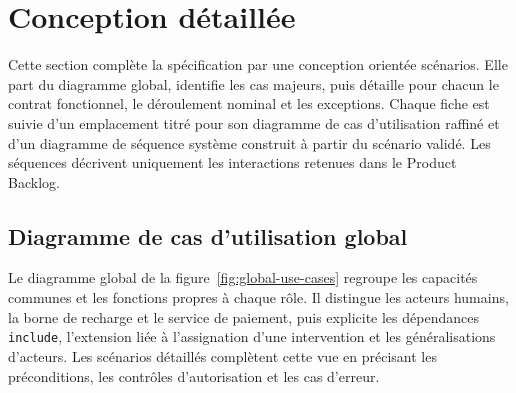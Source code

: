 \section{Conception détaillée}

Cette section complète la spécification par une conception orientée scénarios.
Elle part du diagramme global, identifie les cas majeurs, puis détaille pour chacun
le contrat fonctionnel, le déroulement nominal et les exceptions. Chaque fiche est
suivie d'un emplacement titré pour son diagramme de cas d'utilisation raffiné et
d'un diagramme de séquence système construit à partir du scénario validé. Les
séquences décrivent uniquement les interactions retenues dans le Product Backlog.

\newcommand{\UseCaseUmlPlate}[3]{%
  \begin{figure}[p]
    \centering
    \begin{tcolorbox}[
      width=0.94\textwidth,
      height=7.0cm,
      colback=ctpaper,
      colframe=ctline,
      boxrule=0.8pt,
      arc=2mm,
      valign=center,
      halign=center
    ]
      {\large\bfseries\color{ctdark}Diagramme de cas d'utilisation raffiné}\\[2mm]
      {\bfseries #1}\\[2mm]
      {\color{ctgray}Emplacement réservé pour #1}\\[1mm]
      {\small Acteurs, frontière du système, spécialisations et relations
      \texttt{include}/\texttt{extend}.}
    \end{tcolorbox}
    \caption{Emplacement du diagramme de cas d'utilisation raffiné -- #1}
    \label{fig:#2-refined-use-case}
  \end{figure}

  \begin{figure}[p]
    \centering
    \resizebox{0.96\textwidth}{!}{}
    \caption{Diagramme de séquence système -- #1}
    \label{fig:#2-sequence}
  \end{figure}
  \clearpage
}

\subsection{Diagramme de cas d'utilisation global}

Le diagramme global de la figure~\ref{fig:global-use-cases} regroupe les capacités
communes et les fonctions propres à chaque rôle. Il distingue les acteurs humains,
la borne de recharge et le service de paiement, puis explicite les dépendances
\texttt{include}, l'extension liée à l'assignation d'une intervention et les
généralisations d'acteurs. Les scénarios détaillés complètent cette vue en précisant
les préconditions, les contrôles d'autorisation et les cas d'erreur.

